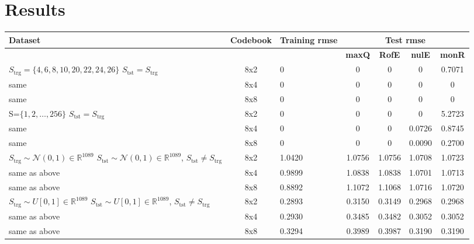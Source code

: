 \section{Results}
\begin{table}
\centering
\begin{tabular}{|p{2.5in}|c|p{0.7in}|c|c|c|c|}\hline
\textbf{Dataset}							&\textbf{Codebook} &\textbf{Training rmse}	&\multicolumn{4}{|c|}{\textbf{Test rmse}} \\\hline
												& 			  			 	&								&\textbf{maxQ} 		&\textbf{RofE} 		&\textbf{nulE} 		&\textbf{monR}\\\hline
$S_{\textrm{trg}}=\{4, 6, 8, 10, 20, 22, 24, 26\}$ \newline $S_{\textrm{tst}}=S_{\textrm{trg}}$ 
                                                &8x2							&0								&0						&0							&{\color{red}0} 		&0.7071\\\hline
same                                         &8x4							&0								&0						&0							&{\color{red}0} 		&0\\\hline
same                                         &8x8							&0								&0						&0							&{\color{red}0} 		&0\\\hline\hline
S=$\{1, 2, \ldots, 256\}$  \newline $S_{\textrm{tst}}=S_{\textrm{trg}}$  				
												&8x2							&0                     		&0						&0							&{\color{red}0}		&5.2723\\\hline
same                                         &8x4							&0								&0						&0							&{\color{red}0.0726} &0.8745\\\hline
same                                         &8x8							&0								&0						&0							&{\color{red}0.0090} &0.2700\\\hline\hline

$S_{\textrm{trg}} \sim \mathcal{N}(0, 1) \in \mathbb{R}^{1089}$ 	 \newline $S_{\textrm{tst}} \sim \mathcal{N}(0, 1) \in \mathbb{R}^{1089}$, $S_{\textrm{tst}} \neq S_{\textrm{trg}}$	
		              							&8x2							&1.0420						&1.0756   	 		&1.0756    				&{\color{red}1.0708} 	&1.0723\\\hline
same as above							&8x4							&0.9899						&1.0838	   	 		&1.0838    				&{\color{red}1.0701}   &1.0713\\\hline
same as above							&8x8							&0.8892						&1.1072	   	 		&1.1068    				&{\color{red}1.0716}   &1.0720\\\hline\hline
$S_{\textrm{trg}} \sim U[0, 1] \in \mathbb{R}^{1089}$ 	 \newline $S_{\textrm{tst}} \sim U[0, 1] \in \mathbb{R}^{1089}$, $S_{\textrm{tst}} \neq S_{\textrm{trg}}$	
		              							&8x2							&0.2893						&0.3150   	 		&0.3149    				&{\color{red}0.2968}	&0.2968\\\hline
same as above							&8x4							&0.2930						&0.3485   	 		&0.3482    				&{\color{red}0.3052}    &0.3052\\\hline
same as above							&8x8							&0.3294						&0.3989   	 		&0.3987    				&{\color{red}0.3190}    &0.3190\\\hline




\end{tabular}
\end{table}
